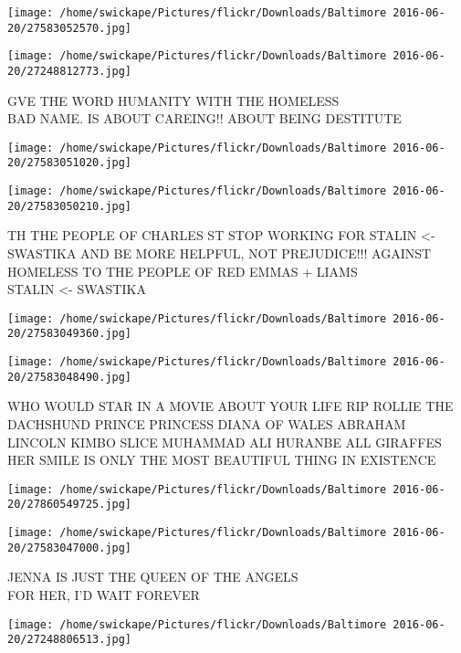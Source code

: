 \documentclass[10pt,letterpaper]{article}
\begin{document}
\texttt{[image: /home/swickape/Pictures/flickr/Downloads/Baltimore 2016-06-20/27583052570.jpg]}

\vspace{0.25in}
\texttt{[image: /home/swickape/Pictures/flickr/Downloads/Baltimore 2016-06-20/27248812773.jpg]}

GVE THE WORD HUMANITY WITH THE HOMELESS\\
BAD NAME.  IS ABOUT CAREING!! ABOUT BEING DESTITUTE\\
\pagebreak

\texttt{[image: /home/swickape/Pictures/flickr/Downloads/Baltimore 2016-06-20/27583051020.jpg]}

\vspace{0.25in}
\texttt{[image: /home/swickape/Pictures/flickr/Downloads/Baltimore 2016-06-20/27583050210.jpg]}

TH THE PEOPLE OF CHARLES ST STOP WORKING FOR STALIN <{-} SWASTIKA AND BE MORE HELPFUL, NOT PREJUDICE!!! AGAINST HOMELESS TO THE PEOPLE OF RED EMMAS + LIAMS\\
STALIN <{-} SWASTIKA\\
\pagebreak

\texttt{[image: /home/swickape/Pictures/flickr/Downloads/Baltimore 2016-06-20/27583049360.jpg]}

\vspace{0.25in}
\texttt{[image: /home/swickape/Pictures/flickr/Downloads/Baltimore 2016-06-20/27583048490.jpg]}

WHO WOULD STAR IN A MOVIE ABOUT YOUR LIFE RIP ROLLIE THE DACHSHUND PRINCE PRINCESS DIANA OF WALES ABRAHAM LINCOLN KIMBO SLICE MUHAMMAD ALI HURANBE ALL GIRAFFES\\
HER SMILE IS ONLY THE MOST BEAUTIFUL THING IN  EXISTENCE\\
\pagebreak

\texttt{[image: /home/swickape/Pictures/flickr/Downloads/Baltimore 2016-06-20/27860549725.jpg]}

\vspace{0.25in}
\texttt{[image: /home/swickape/Pictures/flickr/Downloads/Baltimore 2016-06-20/27583047000.jpg]}

JENNA IS JUST THE QUEEN OF THE ANGELS\\
FOR HER, I'D WAIT FOREVER\\
\pagebreak

\texttt{[image: /home/swickape/Pictures/flickr/Downloads/Baltimore 2016-06-20/27248806513.jpg]}
\end{document}
